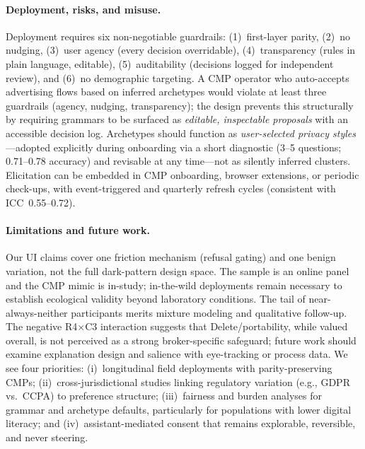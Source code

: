 \documentclass{eusset}
\begin{document}
\paragraph{Deployment, risks, and misuse.}
Deployment requires six non-negotiable guardrails: (1)~first-layer parity, (2)~no nudging, (3)~user agency (every decision overridable), (4)~transparency (rules in plain language, editable), (5)~auditability (decisions logged for independent review), and (6)~no demographic targeting. A CMP operator who auto-accepts advertising flows based on inferred archetypes would violate at least three guardrails (agency, nudging, transparency); the design prevents this structurally by requiring grammars to be surfaced as \emph{editable, inspectable proposals} with an accessible decision log. Archetypes should function as \emph{user-selected privacy styles}---adopted explicitly during onboarding via a short diagnostic (3--5 questions; 0.71--0.78 accuracy) and revisable at any time---not as silently inferred clusters. Elicitation can be embedded in CMP onboarding, browser extensions, or periodic check-ups, with event-triggered and quarterly refresh cycles (consistent with ICC~0.55--0.72).

\paragraph{Limitations and future work.}
Our UI claims cover one friction mechanism (refusal gating) and one benign variation, not the full dark-pattern design space. The sample is an online panel and the CMP mimic is in-study; in-the-wild deployments remain necessary to establish ecological validity beyond laboratory conditions. The tail of near-always-neither participants merits mixture modeling and qualitative follow-up. The negative R4$\times$C3 interaction suggests that Delete/portability, while valued overall, is not perceived as a strong broker-specific safeguard; future work should examine explanation design and salience with eye-tracking or process data. We see four priorities: (i)~longitudinal field deployments with parity-preserving CMPs; (ii)~cross-jurisdictional studies linking regulatory variation (e.g., GDPR vs.\ CCPA) to preference structure; (iii)~fairness and burden analyses for grammar and archetype defaults, particularly for populations with lower digital literacy; and (iv)~assistant-mediated consent that remains explorable, reversible, and never steering.
\end{document}
